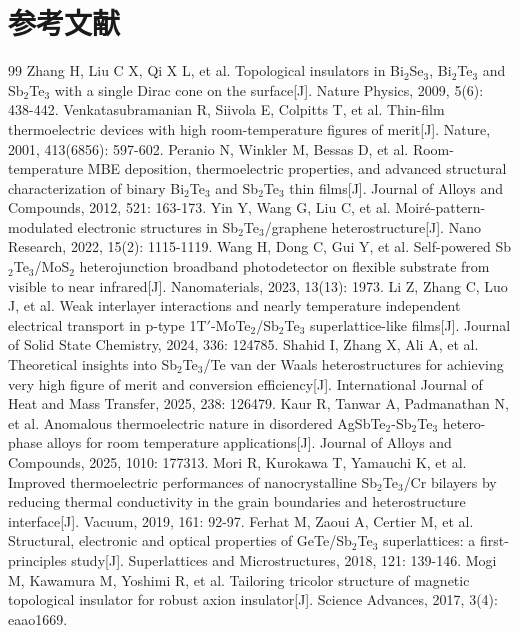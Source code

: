 \documentclass[12pt,a4paper]{ctexart}
\begin{document}
\section*{参考文献}
\begin{thebibliography}{99}
 Zhang H, Liu C X, Qi X L, et al. Topological insulators in Bi$_2$Se$_3$, Bi$_2$Te$_3$ and Sb$_2$Te$_3$ with a single Dirac cone on the surface[J]. Nature Physics, 2009, 5(6): 438-442.
 Venkatasubramanian R, Siivola E, Colpitts T, et al. Thin-film thermoelectric devices with high room-temperature figures of merit[J]. Nature, 2001, 413(6856): 597-602.
 Peranio N, Winkler M, Bessas D, et al. Room-temperature MBE deposition, thermoelectric properties, and advanced structural characterization of binary Bi$_2$Te$_3$ and Sb$_2$Te$_3$ thin films[J]. Journal of Alloys and Compounds, 2012, 521: 163-173.
 Yin Y, Wang G, Liu C, et al. Moir\'e-pattern-modulated electronic structures in Sb$_2$Te$_3$/graphene heterostructure[J]. Nano Research, 2022, 15(2): 1115-1119.
 Wang H, Dong C, Gui Y, et al. Self-powered Sb$_2$Te$_3$/MoS$_2$ heterojunction broadband photodetector on flexible substrate from visible to near infrared[J]. Nanomaterials, 2023, 13(13): 1973.
 Li Z, Zhang C, Luo J, et al. Weak interlayer interactions and nearly temperature independent electrical transport in p-type 1T$'$-MoTe$_2$/Sb$_2$Te$_3$ superlattice-like films[J]. Journal of Solid State Chemistry, 2024, 336: 124785.
 Shahid I, Zhang X, Ali A, et al. Theoretical insights into Sb$_2$Te$_3$/Te van der Waals heterostructures for achieving very high figure of merit and conversion efficiency[J]. International Journal of Heat and Mass Transfer, 2025, 238: 126479.
 Kaur R, Tanwar A, Padmanathan N, et al. Anomalous thermoelectric nature in disordered AgSbTe$_2$-Sb$_2$Te$_3$ hetero-phase alloys for room temperature applications[J]. Journal of Alloys and Compounds, 2025, 1010: 177313.
 Mori R, Kurokawa T, Yamauchi K, et al. Improved thermoelectric performances of nanocrystalline Sb$_2$Te$_3$/Cr bilayers by reducing thermal conductivity in the grain boundaries and heterostructure interface[J]. Vacuum, 2019, 161: 92-97.
 Ferhat M, Zaoui A, Certier M, et al. Structural, electronic and optical properties of GeTe/Sb$_2$Te$_3$ superlattices: a first-principles study[J]. Superlattices and Microstructures, 2018, 121: 139-146.
 Mogi M, Kawamura M, Yoshimi R, et al. Tailoring tricolor structure of magnetic topological insulator for robust axion insulator[J]. Science Advances, 2017, 3(4): eaao1669.
\end{thebibliography}
\end{document}
